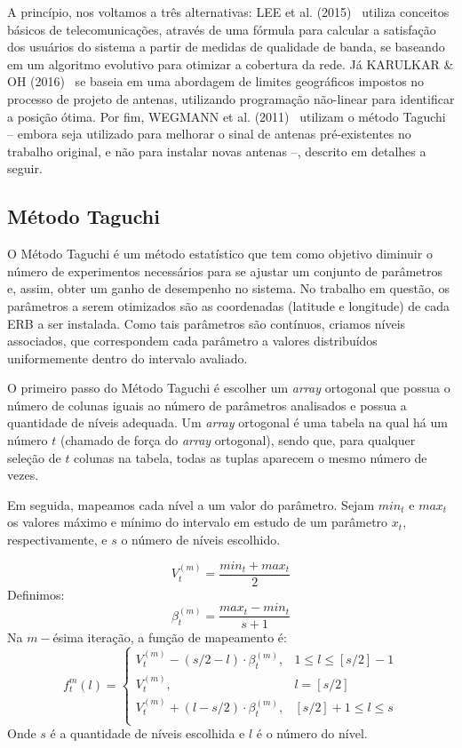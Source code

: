 \documentclass[]{politex}
\begin{document}
A princípio, nos voltamos a três alternativas: LEE et al. (2015)~
\cite{evolutivo} utiliza conceitos básicos de telecomunicações, através de uma
fórmula para calcular a satisfação dos usuários do sistema a partir de medidas
de qualidade de banda, se baseando em um algoritmo evolutivo para otimizar a
cobertura da rede. Já KARULKAR \& OH (2016)~\cite{nao-linear} se baseia em uma
abordagem de limites geográficos impostos no processo de projeto de antenas,
utilizando programação não-linear para identificar a posição ótima. Por fim,
WEGMANN et al. (2011)~\cite{taguchi} utilizam o método Taguchi -- embora seja
utilizado para melhorar o sinal de antenas pré-existentes no trabalho original,
e não para instalar novas antenas --, descrito em detalhes a seguir.

\subsection{Método Taguchi}

O Método Taguchi é um método estatístico que tem como objetivo diminuir o número
de experimentos necessários para se ajustar um conjunto de parâmetros e, assim,
obter um ganho de desempenho no sistema. No trabalho em questão, os parâmetros a
serem otimizados são as coordenadas (latitude e longitude) de cada ERB a ser
instalada. Como tais parâmetros são contínuos, criamos níveis associados, que
correspondem cada parâmetro a valores distribuídos uniformemente dentro do
intervalo avaliado.

O primeiro passo do Método Taguchi é escolher um \textit{array} ortogonal que
possua o número de colunas iguais ao número de parâmetros analisados e possua a
quantidade de níveis adequada. Um \textit{array} ortogonal é uma tabela na qual
há um número $t$ (chamado de força do \textit{array} ortogonal), sendo que, para
qualquer seleção de $t$ colunas na tabela, todas as tuplas aparecem o mesmo
número de vezes.

Em seguida, mapeamos cada nível a um valor do parâmetro. Sejam $min_t$ e $max_t$
os valores máximo e mínimo do intervalo em estudo de um parâmetro $x_t$,
respectivamente, e $s$ o número de níveis escolhido.

\begin{equation}
    V_t^{(m)}=\frac{min_t+max_t}{2}
\end{equation}
Definimos:
\begin{equation}
    \beta_t^{(m)} = \frac{max_t-min_t}{s+1}
\end{equation}
Na $m-$ésima iteração, a função de mapeamento é:
\begin{equation}
    f_t^m(l) =
    \begin{cases}
        V_t^{(m)} - (s/2 - l)\cdot\beta_t^{(m)}, & 1 \leq l \leq [s/2] - 1 \\
        V_t^{(m)}, &  l = [s/2]\\
        V_t^{(m)} + (l - s/2)\cdot\beta_t^{(m)}, & [s/2] + 1 \leq l \leq s \\
    \end{cases}
\end{equation}
Onde $s$ é a quantidade de níveis escolhida e $l$ é o número do nível.
\end{document}
